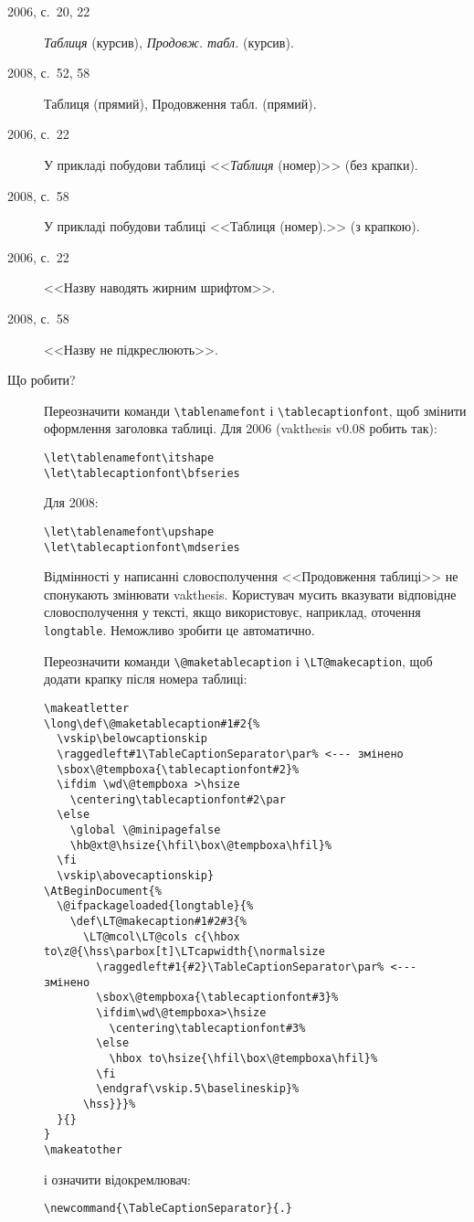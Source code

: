 \documentclass[a4paper]{article}
\newcommand{\vakthesis}{\textsf{vakthesis}}
\begin{document}
\begin{description}
\item[2006, с.~20, 22] \textit{Таблиця} (курсив),
  \textit{Продовж. табл.} (курсив).

\item[2008, с.~52, 58] Таблиця (прямий), Продовження табл. (прямий).

\item[2006, с.~22] У прикладі побудови таблиці <<\textit{Таблиця}
  (номер)>> (без крапки).

\item[2008, с.~58] У прикладі побудови таблиці <<Таблиця (номер).>> (з
  крапкою).

\item[2006, с.~22] <<Назву наводять жирним шрифтом>>.

\item[2008, с.~58] <<Назву не підкреслюють>>.

\item[Що робити?] Переозначити команди \verb|\tablenamefont| і
  \verb|\tablecaptionfont|, щоб змінити оформлення заголовка
  таблиці. Для 2006 (\vakthesis{} v0.08 робить так):
\begin{verbatim}
\let\tablenamefont\itshape
\let\tablecaptionfont\bfseries
\end{verbatim}
Для 2008:
\begin{verbatim}
\let\tablenamefont\upshape
\let\tablecaptionfont\mdseries
\end{verbatim}

Відмінності у написанні словосполучення <<Продовження таблиці>> не
спонукають змінювати \vakthesis{}. Користувач мусить вказувати
відповідне словосполучення у тексті, якщо використовує, наприклад,
оточення \verb|longtable|. Неможливо зробити це автоматично.

Переозначити команди \verb|\@maketablecaption| і
\verb|\LT@makecaption|, щоб додати крапку після номера таблиці:
\begin{verbatim}
\makeatletter
\long\def\@maketablecaption#1#2{%
  \vskip\belowcaptionskip
  \raggedleft#1\TableCaptionSeparator\par% <--- змінено
  \sbox\@tempboxa{\tablecaptionfont#2}%
  \ifdim \wd\@tempboxa >\hsize
    \centering\tablecaptionfont#2\par
  \else
    \global \@minipagefalse
    \hb@xt@\hsize{\hfil\box\@tempboxa\hfil}%
  \fi
  \vskip\abovecaptionskip}
\AtBeginDocument{%
  \@ifpackageloaded{longtable}{%
    \def\LT@makecaption#1#2#3{%
      \LT@mcol\LT@cols c{\hbox to\z@{\hss\parbox[t]\LTcapwidth{\normalsize
        \raggedleft#1{#2}\TableCaptionSeparator\par% <--- змінено
        \sbox\@tempboxa{\tablecaptionfont#3}%
        \ifdim\wd\@tempboxa>\hsize
          \centering\tablecaptionfont#3%
        \else
          \hbox to\hsize{\hfil\box\@tempboxa\hfil}%
        \fi
        \endgraf\vskip.5\baselineskip}%
      \hss}}}%
  }{}
}
\makeatother
\end{verbatim}
і означити відокремлювач:
\begin{verbatim}
\newcommand{\TableCaptionSeparator}{.}
\end{verbatim}


\end{description}
\end{document}
